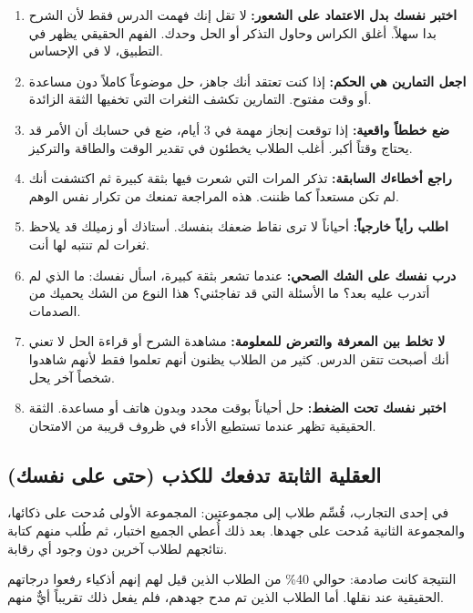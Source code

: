 \documentclass[12pt,a4paper]{book}
\begin{document}
	\begin{enumerate}
		\item \textbf{اختبر نفسك بدل الاعتماد على الشعور:} لا تقل إنك فهمت الدرس فقط لأن الشرح بدا سهلاً. أغلق الكراس وحاول التذكر أو الحل وحدك. الفهم الحقيقي يظهر في التطبيق، لا في الإحساس.
		
		\item \textbf{اجعل التمارين هي الحكم:} إذا كنت تعتقد أنك جاهز، حل موضوعاً كاملاً دون مساعدة أو وقت مفتوح. التمارين تكشف الثغرات التي تخفيها الثقة الزائدة.
		
		\item \textbf{ضع خططاً واقعية:} إذا توقعت إنجاز مهمة في 3 أيام، ضع في حسابك أن الأمر قد يحتاج وقتاً أكبر. أغلب الطلاب يخطئون في تقدير الوقت والطاقة والتركيز.
		
		\item \textbf{راجع أخطاءك السابقة:} تذكر المرات التي شعرت فيها بثقة كبيرة ثم اكتشفت أنك لم تكن مستعداً كما ظننت. هذه المراجعة تمنعك من تكرار نفس الوهم.
		
		\item \textbf{اطلب رأياً خارجياً:} أحياناً لا ترى نقاط ضعفك بنفسك. أستاذك أو زميلك قد يلاحظ ثغرات لم تنتبه لها أنت.
		
		\item \textbf{درب نفسك على الشك الصحي:} عندما تشعر بثقة كبيرة، اسأل نفسك: ما الذي لم أتدرب عليه بعد؟ ما الأسئلة التي قد تفاجئني؟ هذا النوع من الشك يحميك من الصدمات.
		
		\item \textbf{لا تخلط بين المعرفة والتعرض للمعلومة:} مشاهدة الشرح أو قراءة الحل لا تعني أنك أصبحت تتقن الدرس. كثير من الطلاب يظنون أنهم تعلموا فقط لأنهم شاهدوا شخصاً آخر يحل.
		
		\item \textbf{اختبر نفسك تحت الضغط:} حل أحياناً بوقت محدد وبدون هاتف أو مساعدة. الثقة الحقيقية تظهر عندما تستطيع الأداء في ظروف قريبة من الامتحان.
	\end{enumerate}
	
	\subsection{العقلية الثابتة تدفعك للكذب (حتى على نفسك)}
	
	في إحدى التجارب، قُسِّم طلاب إلى مجموعتين: المجموعة الأولى مُدحت على ذكائها، والمجموعة الثانية مُدحت على جهدها. بعد ذلك أُعطي الجميع اختبار، ثم طُلب منهم كتابة نتائجهم لطلاب آخرين دون وجود أي رقابة.
	
	النتيجة كانت صادمة: حوالي 40\% من الطلاب الذين قيل لهم إنهم أذكياء رفعوا درجاتهم الحقيقية عند نقلها. أما الطلاب الذين تم مدح جهدهم، فلم يفعل ذلك تقريباً أيٌّ منهم.
	
\end{document}

